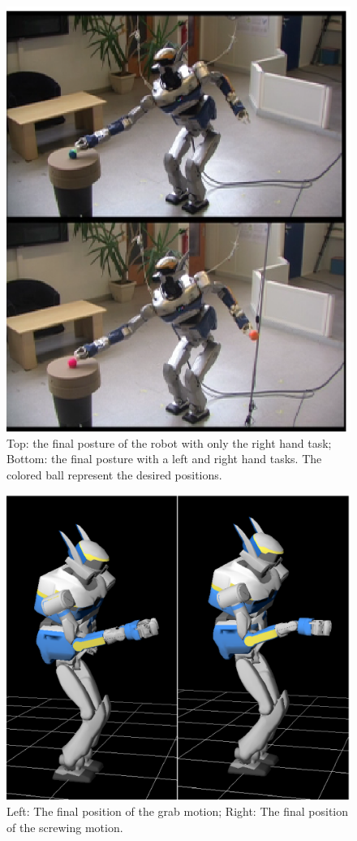 \documentclass[letterpaper, 10pt, conference]{ieeeconf}      %
\begin{document}
\begin{figure}[t]
\begin{center}
\includegraphics[width=0.7\linewidth]{img/spotDiff1.ps}
\end{center}
\caption{Top: the final posture of the robot with only the right hand task; Bottom:
the final posture with a left and right hand tasks. The colored ball represent the desired positions.}
\label{fig:spotDiff1}
\end{figure}

\begin{figure}[t]
\begin{center}
\includegraphics[width=0.7\linewidth]{img/spotDiff2bis.ps}
\end{center}
\caption{Left: The final position of the grab motion; Right: The final position of the screwing motion.}
\label{fig:spotDiff2}
\vspace{-3pt}
\end{figure}
\end{document}
